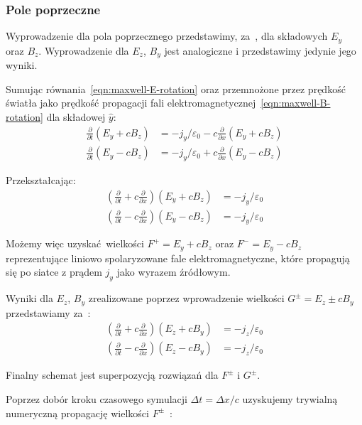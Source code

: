 \subsubsection{Pole poprzeczne}
Wyprowadzenie dla pola poprzecznego przedstawimy, za~\cite{birdsall}, dla składowych $E_y$ oraz $B_z$. Wyprowadzenie dla $E_z$, $B_y$ jest analogiczne i przedstawimy jedynie jego wyniki.

Sumując równania~\ref{eqn:maxwell-E-rotation} oraz przemnożone przez prędkość światła jako prędkość propagacji fali elektromagnetycznej~\ref{eqn:maxwell-B-rotation} dla składowej $\hat{y}$:
\begin{align}
    \frac{\partial}{\partial t} \left(E_y + c B_z\right) &= - j_y / \varepsilon_0 - c \frac{\partial}{\partial x} \left(E_y + c B_z\right) \\
    \frac{\partial}{\partial t} \left(E_y - c B_z\right) &= - j_y / \varepsilon_0 + c \frac{\partial}{\partial x} \left(E_y - c B_z\right)
\end{align}

Przekształcając:
\begin{align}
    \left(\frac{\partial}{\partial t} + c \frac{\partial}{\partial x}\right)\left(E_y + c B_z\right) &= - j_y / \varepsilon_0\\
    \left(\frac{\partial}{\partial t} - c \frac{\partial}{\partial x}\right)\left(E_y - c B_z\right) &= - j_y / \varepsilon_0
\end{align}

Możemy więc uzyskać wielkości $F^+ = E_y + c B_z$ oraz $F^- = E_y - c B_z$ reprezentujące liniowo spolaryzowane fale elektromagnetyczne, które propagują się po siatce z prądem $j_y$ jako wyrazem źródłowym.

Wyniki dla $E_z$, $B_y$ zrealizowane poprzez wprowadzenie wielkości $G^\pm = E_z \pm c B_y$ przedstawiamy za~\cite{birdsall}:
\begin{align}
    \left(\frac{\partial}{\partial t} + c \frac{\partial}{\partial x}\right)\left(E_z + c B_y\right) &= - j_z / \varepsilon_0 \\
    \left(\frac{\partial}{\partial t} - c \frac{\partial}{\partial x}\right)\left(E_z - c B_y\right) &= - j_z / \varepsilon_0
\end{align}

Finalny schemat jest superpozycją rozwiązań dla $F^\pm$ i $G^\pm$.

Poprzez dobór kroku czasowego symulacji $\Delta t = \Delta x / c$ uzyskujemy trywialną numeryczną propagację wielkości $F^\pm$~\cite{Jablonski-notes}:

